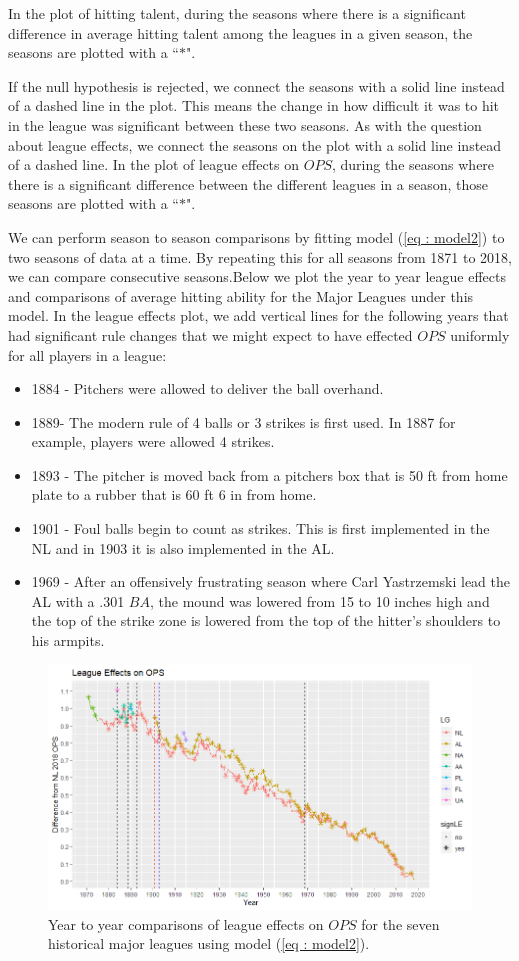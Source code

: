 \documentclass [52pt] {article}
\begin{document}
 In the plot of hitting talent, during the seasons where there is a significant difference in average hitting talent among the leagues in a given season, the seasons are plotted with a ``$*$".

If the null hypothesis is rejected, we connect the seasons with a solid line instead of a dashed line in the plot.  This means the change in how difficult it was to hit in the league was significant between these two seasons.    As with the question about league effects, we connect the seasons on the plot with a solid line instead of a dashed line.  In the plot of league effects on $OPS$, during the seasons where there is a significant difference between the different leagues in a season, those seasons are plotted with a ``$*$".  


We can perform season to season comparisons by fitting model (\ref{eq : model2}) to two seasons of data at a time.  By repeating this for all seasons from 1871 to 2018, we can compare consecutive seasons.Below we plot the year to year league effects and comparisons of average hitting ability for the Major Leagues under this model.  In the league effects plot, we add vertical lines for the following years that had significant rule changes that we might expect to  have effected $OPS$ uniformly for all players in a league:
\begin{itemize}
\item1884 - Pitchers were allowed to deliver the ball overhand.
\item 1889- The modern rule of 4 balls or 3 strikes is first used.  In 1887 for example, players were allowed 4 strikes.
\item 1893 - The pitcher is moved back from a pitchers box that is 50 ft from home plate to a rubber that is 60 ft 6 in from home.
\item 1901 - Foul balls begin to count as strikes.  This is first implemented in the NL and in 1903 it is also implemented in the AL.
\item1969 - After an offensively frustrating season where Carl Yastrzemski lead the AL with a .301 $BA$, the mound was lowered from 15 to 10 inches high and the top of the strike zone is lowered from the top of the hitter's shoulders to his armpits.
\end{itemize}
\begin{figure}[h!]
\centering
\includegraphics[scale = 0.75]{MLByr2yrLE_v2.png}
\caption{\label{fig : LEv2} Year to year comparisons of league effects on $OPS$ for the seven historical major leagues using model (\ref{eq : model2}).  }
\end{figure}
\end{document}

